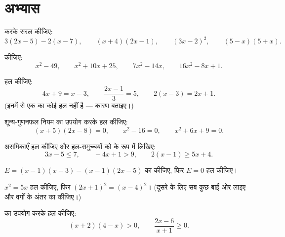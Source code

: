 \section{अभ्यास}

\begin{exercise}[$\star$]\label{exo:g10:algebra:1}
 करके सरल कीजिए:
\[
3(2x - 5) - 2(x - 7), \qquad
(x + 4)(2x - 1), \qquad
(3x - 2)^2, \qquad
(5 - x)(5 + x).
\]
\end{exercise}

\begin{exercise}[$\star$]\label{exo:g10:algebra:2}
 कीजिए:
\[
x^2 - 49, \qquad
x^2 + 10x + 25, \qquad
7x^2 - 14x, \qquad
16x^2 - 8x + 1 .
\]
\end{exercise}

\begin{exercise}[$\star$]\label{exo:g10:algebra:3}
हल कीजिए:
\[
4x + 9 = x - 3, \qquad
\frac{2x - 1}{3} = 5, \qquad
2(x - 3) = 2x + 1 .
\]
(इनमें से एक का कोई हल नहीं है --- कारण बताइए।)
\end{exercise}

\begin{exercise}[$\star$]\label{exo:g10:algebra:4}
शून्य-गुणनफल नियम का उपयोग करके हल कीजिए:
\[
(x + 5)(2x - 8) = 0, \qquad
x^2 - 16 = 0, \qquad
x^2 + 6x + 9 = 0 .
\]
\end{exercise}

\begin{exercise}[$\star$]\label{exo:g10:algebra:5}
असमिकाएँ हल कीजिए और हल-समुच्चयों को  के रूप में लिखिए:
\[
3x - 5 \leq 7, \qquad
-4x + 1 > 9, \qquad
2(x - 1) \geq 5x + 4 .
\]
\end{exercise}

\begin{exercise}[$\star\star$]\label{exo:g10:algebra:6}
$E = (x - 1)(x + 3) - (x - 1)(2x - 5)$ का  कीजिए, फिर $E = 0$ हल कीजिए।
\end{exercise}

\begin{exercise}[$\star\star$]\label{exo:g10:algebra:7}
$x^2 = 5x$ हल कीजिए, फिर $(2x + 1)^2 = (x - 4)^2$। (दूसरे के लिए सब कुछ बाईं ओर लाइए और वर्गों के
अंतर का  कीजिए।)
\end{exercise}

\begin{exercise}[$\star\star$]\label{exo:g10:algebra:8}
 का उपयोग करके हल कीजिए:
\[
(x + 2)(4 - x) > 0,
\qquad
\frac{2x - 6}{x + 1} \geq 0 .
\]
\end{exercise}

